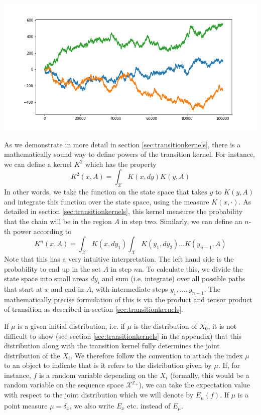 \documentclass[a4paper, draft]{article}
\theoremstyle{own}
\theoremstyle{remark}
\newcommand{\Z}{\mathbb{Z}}
\begin{document}
\includegraphics[scale=.47]{RandomWalkSample.png}


As we demonstrate in more detail in section \ref{sec:transitionkernels}, there is a mathematically sound way to define powers of the transition kernel. For instance, we can define a kernel $K^2$ which has the property
$$
K^2(x,A) = \int_{\mathcal X} K(x,dy) K(y,A)
$$
In other words, we take the function on the state space that takes $y$ to $K(y,A)$ and integrate this function over the state space, using the measure $K(x,\cdot)$. As detailed in section \ref{sec:transitionkernels}, this kernel measures the probability that the chain will be in the region $A$ in step two. Similarly, we can define an $n$-th power according to
$$
K^n(x,A) = \int_{\mathcal X} K(x,dy_1) \int_{\mathcal X} K(y_1, dy_2) \dots K(y_{n-1}, A)
$$
Note that this has a very intuitive interpretation. The left hand side is the probability to end up in the set $A$ in step $n$n. To calculate this, we divide the state space into small areas $dy_i$ and sum (i.e. integrate) over all possible paths that start at $x$ and end in $A$, with intermediate steps $y_1, \dots, y_{n-1}$. The mathematically precise formulation of this is via the product and tensor product of transition as described in section \ref{sec:transitionkernels}.

If $\mu$ is a given initial distribution, i.e. if $\mu$ is the distribution of $X_0$, it is not difficult to show (see section \ref{sec:transitionkernels} in the appendix) that this distribution along with the transition kernel fully determines the joint distribution of the $X_i$. We therefore follow the convention to attach the index $\mu$ to an object to indicate that is it refers to the distribution given by $\mu$. If, for instance, $f$ is a random variable depending on the $X_i$ (formally, this would be a random variable on the sequence space ${\mathcal X}^{\Z_+}$), we can take the expectation value with respect to the joint distribution which we will denote by $E_{\mu}(f)$. If $\mu$ is a point measure $\mu = \delta_x$, we also write $E_x$ etc. instead of $E_\mu$. 
\end{document}
